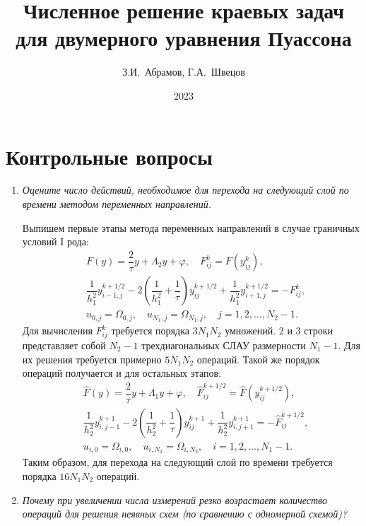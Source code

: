 \documentclass[12pt, a4paper]{article}
\title{Численное решение краевых задач для двумерного уравнения Пуассона}
\author{З.И.~Абрамов, Г.А.~Швецов}
\date{2023}
\begin{document}
	\newcommand{\pl}{\partial}
	\maketitle
	
	\tableofcontents
	
	\newpage
	
	\section{Контрольные вопросы}
	\begin{enumerate}
		\item \textit{Оцените число действий, необходимое для перехода на следующий слой по времени методом переменных направлений.}
		\smallskip
		
		Выпишем первые этапы метода переменных направлений в случае граничных условий I рода:
		\begin{eqnarray*}
			&F(y) = \dfrac2\tau y + \Lambda_2 y + \varphi, \quad F^k_{ij} = F(y^k_{ij}),\\
			&\dfrac1{h_1^2} y^{k+1/2}_{i-1,j} - 2 \left(\dfrac1{h_1^2} + \dfrac1\tau\right) y^{k+1/2}_{ij} + \dfrac1{h_1^2} y^{k+1/2}_{i+1,j} = -F^k_{ij},\\
			&u_{0,j} = \Omega_{0,j}, \quad u_{N_1,j} = \Omega_{N_1,j}, \quad j = 1, 2, \dots, N_2 -1.
		\end{eqnarray*}
		Для вычисления $F^k_{ij}$ требуется порядка $3 N_1 N_2$ умножений. 2 и 3 строки представляет собой $N_2-1$ трехдиагональных СЛАУ размерности $N_1 - 1$. Для их решения требуется примерно $5 N_1 N_2$ операций. Такой же порядок операций получается и для остальных этапов:
		\begin{eqnarray*}
			&\hat{F}(y) = \dfrac2\tau y + \Lambda_1 y + \varphi, \quad \hat{F}^{k+1/2}_{ij} = \hat{F}(y^{k+1/2}_{ij}),\\
			&\dfrac1{h_2^2} y^{k+1}_{i,j-1} - 2 \left(\dfrac1{h_2^2} + \dfrac1\tau\right) y^{k+1}_{ij} + \dfrac1{h_2^2} y^{k+1}_{i,j+1} = -\hat{F}^{k+1/2}_{ij},\\
			&u_{i,0} = \Omega_{i,0}, \quad u_{i,N_2} = \Omega_{i,N_2}, \quad i = 1, 2, \dots, N_1 -1.
		\end{eqnarray*}
		Таким образом, для перехода на следующий слой по времени требуется порядка $16 N_1 N_2$ операций.
		
		\item \textit{Почему при увеличении числа измерений резко возрастает количество операций для решения неявных схем (по сравнению с одномерной схемой)?}
		\smallskip
		

\end{enumerate}
\end{document}
